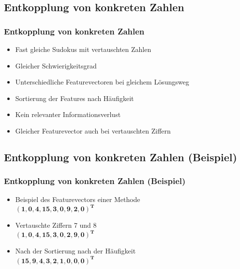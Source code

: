 \documentclass[accentcolor=tud6b,colorbacktitle,inverttitle,landscape,german,presentation,t]{tudbeamer}
\begin{document}
	\subsection{Entkopplung von konkreten Zahlen}
		\begin{frame}
		\frametitle{Entkopplung von konkreten Zahlen}
		\begin{itemize}
		\item Fast gleiche Sudokus mit vertauschten Zahlen
		\item Gleicher Schwierigkeitsgrad
		\item Unterschiedliche Featurevectoren bei gleichem Lösungsweg
		\item Sortierung der Features nach Häufigkeit
		\item Kein relevanter Informationsverlust
		\item Gleicher Featurevector auch bei vertauschten Ziffern
		\end{itemize}
		\end{frame}

	\subsection{Entkopplung von konkreten Zahlen (Beispiel)}
		\begin{frame}
		\frametitle{Entkopplung von konkreten Zahlen (Beispiel)}
		\begin{itemize}
		\item Beispiel des Featurevectors einer Methode\\$\mathbf{(1, 0, 4, 15, 3, 0, 9, 2, 0)^{T}}$
		\item Vertauschte Ziffern 7 und 8\\$\mathbf{(1, 0, 4, 15, 3, 0, 2, 9, 0)^{T}}$
		\item Nach der Sortierung nach der Häufigkeit\\$\mathbf{(15, 9, 4, 3, 2, 1, 0, 0, 0)^{T}}$
		\end{itemize}
		\end{frame}
\end{document}
